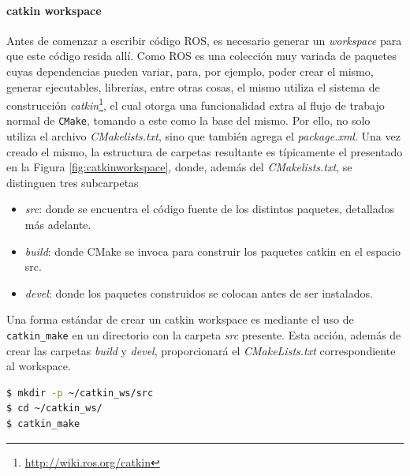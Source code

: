 \paragraph{catkin workspace}
Antes de comenzar a escribir código ROS, es necesario generar un \textit{workspace} para que este código resida allí. Como ROS es una colección muy variada de paquetes cuyas dependencias pueden variar, para, por ejemplo, poder crear el mismo, generar ejecutables, librerías, entre otras cosas, el mismo utiliza el sistema de construcción \textit{catkin}\footnote{\url{http://wiki.ros.org/catkin}}, el cual otorga una funcionalidad extra al flujo de trabajo normal de \texttt{CMake}, tomando a este como la base del mismo. Por ello, no solo utiliza el archivo \textit{CMakelists.txt}, sino que también agrega el \textit{package.xml}. Una vez creado el mismo, la estructura de carpetas resultante es típicamente el presentado en la Figura \ref{fig:catkinworkspace}, donde, además del \textit{CMakelists.txt}, se distinguen tres subcarpetas
\begin{itemize}
    \item \textit{src}: donde se encuentra el código fuente de los distintos paquetes, detallados más adelante.
    \item \textit{build}: donde CMake se invoca para construir los paquetes catkin en el espacio src.
    \item \textit{devel}: donde los paquetes construidos se colocan antes de ser instalados.
\end{itemize}


Una forma estándar de crear un catkin workspace es mediante el uso de \lstinline[language=bash]{catkin_make} en un directorio con la carpeta \textit{src} presente. Esta acción, además de crear las carpetas \textit{build} y \textit{devel}, proporcionará el \textit{CMakeLists.txt} correspondiente al workspace.
\begin{lstlisting}[language=bash]
$ mkdir -p ~/catkin_ws/src
$ cd ~/catkin_ws/
$ catkin_make
\end{lstlisting}

